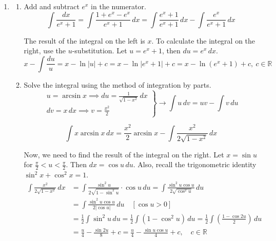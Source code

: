 \documentclass[a4paper, 12pt]{article}
\begin{document}
\begin{enumerate}[leftmargin=*,label=\textbf{\arabic*.}]
\begin{enumerate}[leftmargin=*,label=\textbf{\alph*.}]
For $x>1$, $ e^{1/x}$ tends to $1$ and $x^2$ is increasing. Therefore, the function is decreasing for $x>1$.

We may now apply the Integral Test. Handle the improper integral by taking the limit.
\[\int_1^\infty\frac{ e^{1/x}}{x^2}\,dx-=\lim_{R\to\infty}- e^{1/x}\bigg|_1^\infty=\lim_{R\to\infty}\left(- e^{1/R}+ e^{1}\right)= e-1\quad(\text{convergent})\]

Since the integral converges, by the Integral Test, the series also $\boxed{\text{converges}}$.
\end{enumerate}

\item \begin{enumerate}[leftmargin=*,label=\textbf{\alph*.}]
\item Add and subtract $ e^x$ in the numerator.
\[\int\frac{dx}{ e^x+1}=\int\frac{1+ e^x- e^x}{ e^x+1}\,dx=\int\frac{ e^x+1}{ e^x+1}\,dx-\int\frac{ e^x}{ e^x+1}\,dx\]

The result of the integral on the left is $x$. To calculate the integral on the right, use the $u$-substitution. Let $u= e^x+1$, then $du= e^x\,dx$.
\[x-\int\frac{du}{u}=x-\ln|u|+c=\boxed{x-\ln\left| e^x+1\right|+c=x-\ln\left( e^x+1\right)+c,\:c\in\mathbb{R}}\]

\item Solve the integral using the method of integration by parts.
\[\left.\begin{array}{c}
\displaystyle u=\arcsin x\implies du=\frac1{\sqrt{1-x^2}}\,dx\\[1em]
\displaystyle dv=x\,dx\implies v=\frac{x^2}2
\end{array}\right\}\rightarrow\int u\,dv=uv-\int v\,du\]

\begin{equation}\int x\arcsin x\,dx=\frac{x^2}2\arcsin x-\int\frac{x^2}{2\sqrt{1-x^2}}\,dx\label{eq:12_13_fall_final_1}\end{equation}

Now, we need to find the result of the integral on the right. Let $x=\sin u$ for $\displaystyle\frac\pi2<u<\frac\pi2$. Then $dx=\cos u\,du$. Also, recall the trigonometric identity $\sin^2x+\cos^2x=1$.
\begin{align*}\int\frac{x^2}{2\sqrt{1-x^2}}\,dx&=\int\frac{\sin^2u}{2\sqrt{1-\sin^2u}}\cdot\cos u\,du=\int\frac{\sin^2u\cos u}{2\sqrt{\cos^2u}}\,du\\[1em]&=\int\frac{\sin^2{u}\cos u}{2\left|\cos u\right|}\,du\quad\left[\cos u > 0\right]\\[1em]&=\frac12\int\sin^2u\,du=\frac12\int\left(1-\cos^2u\right)\,du=\frac12\int\left(\frac{1-\cos2u}2\right)\,du\\[1em]&=\frac u4-\frac{\sin2u}8+c=\frac u4-\frac{\sin u\cos u}4+c,\quad c\in\mathbb{R}\end{align*}


\end{enumerate}
\end{enumerate}
\end{document}
